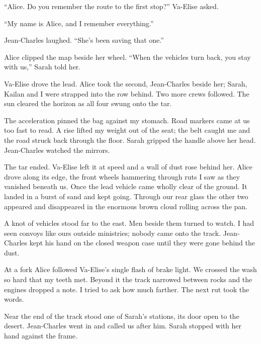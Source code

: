 ``Alice. Do you remember the route to the first stop?'' Va-Elise asked.\par

``My name is Alice, and I remember everything.''\par

Jean-Charles laughed. ``She's been saving that one.''\par

Alice clipped the map beside her wheel. ``When the vehicles turn back, you stay with us,'' Sarah told her.\par

Va-Elise drove the lead. Alice took the second, Jean-Charles beside her; Sarah, Kailan and I were strapped into the row behind. Two more crews followed. The sun cleared the horizon as all four swung onto the tar.\par

The acceleration pinned the bag against my stomach. Road markers came at us too fast to read. A rise lifted my weight out of the seat; the belt caught me and the road struck back through the floor. Sarah gripped the handle above her head. Jean-Charles watched the mirrors.\par

The tar ended. Va-Elise left it at speed and a wall of dust rose behind her. Alice drove along its edge, the front wheels hammering through ruts I saw as they vanished beneath us. Once the lead vehicle came wholly clear of the ground. It landed in a burst of sand and kept going. Through our rear glass the other two appeared and disappeared in the enormous brown cloud rolling across the pan.\par

A knot of vehicles stood far to the east. Men beside them turned to watch. I had seen convoys like ours outside ministries; nobody came onto the track. Jean-Charles kept his hand on the closed weapon case until they were gone behind the dust.\par

At a fork Alice followed Va-Elise's single flash of brake light. We crossed the wash so hard that my teeth met. Beyond it the track narrowed between rocks and the engines dropped a note. I tried to ask how much farther. The next rut took the words.\par

\ornament

Near the end of the track stood one of Sarah's stations, its door open to the desert. Jean-Charles went in and called us after him. Sarah stopped with her hand against the frame.\par

